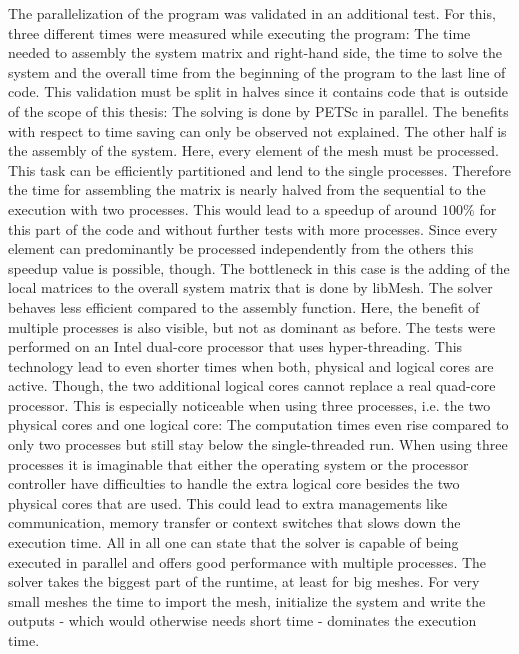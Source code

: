   The parallelization of the program was validated in an additional test. For this, three different times were measured while executing the program: The time needed to assembly the system matrix and right-hand side, the time to solve the system and the overall time from the beginning of the program to the last line of code. This validation must be split in halves since it contains code that is outside of the scope of this thesis: The solving is done by PETSc in parallel. The benefits with respect to time saving can only be observed not explained. The other half is the assembly of the system. Here, every element of the mesh must be processed. This task can be efficiently partitioned and lend to the single processes. Therefore the time for assembling the matrix is nearly halved from the sequential to the execution with two processes. This would lead to a speedup of around $100\%$ for this part of the code and without further tests with more processes. Since every element can predominantly be processed independently from the others this speedup value is possible, though. The bottleneck in this case is the adding of the local matrices to the overall system matrix that is done by libMesh. The solver behaves less efficient compared to the assembly function. Here, the benefit of multiple processes is also visible, but not as dominant as before. The tests were performed on an Intel dual-core processor that uses hyper-threading. This technology lead to even shorter times when both, physical and logical cores are active. Though, the two additional logical cores cannot replace a real quad-core processor. This is especially noticeable when using three processes, i.e. the two physical cores and one logical core: The computation times even rise compared to only two processes but still stay below the single-threaded run. When using three processes it is imaginable that either the operating system or the processor controller have difficulties to handle the extra logical core besides the two physical cores that are used. This could lead to extra managements like communication, memory transfer or context switches that slows down the execution time. All in all one can state that the solver is capable of being executed in parallel and offers good performance with multiple processes. The solver takes the biggest part of the runtime, at least for big meshes. For very small meshes the time to import the mesh, initialize the system and write the outputs - which would otherwise needs short time - dominates the execution time.
  
